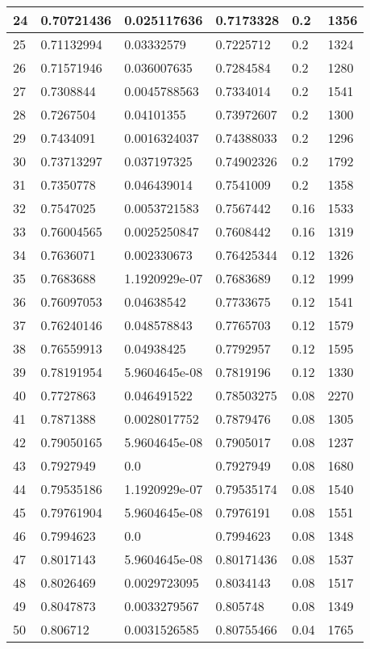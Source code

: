 \begin{longtable}{|l|l|l|l|l|l|}
24 & 0.70721436 & 0.025117636 & 0.7173328 & 0.2 & 1356 \\ \hline 
25 & 0.71132994 & 0.03332579 & 0.7225712 & 0.2 & 1324 \\ \hline 
26 & 0.71571946 & 0.036007635 & 0.7284584 & 0.2 & 1280 \\ \hline 
27 & 0.7308844 & 0.0045788563 & 0.7334014 & 0.2 & 1541 \\ \hline 
28 & 0.7267504 & 0.04101355 & 0.73972607 & 0.2 & 1300 \\ \hline 
29 & 0.7434091 & 0.0016324037 & 0.74388033 & 0.2 & 1296 \\ \hline 
30 & 0.73713297 & 0.037197325 & 0.74902326 & 0.2 & 1792 \\ \hline 
31 & 0.7350778 & 0.046439014 & 0.7541009 & 0.2 & 1358 \\ \hline 
32 & 0.7547025 & 0.0053721583 & 0.7567442 & 0.16 & 1533 \\ \hline 
33 & 0.76004565 & 0.0025250847 & 0.7608442 & 0.16 & 1319 \\ \hline 
34 & 0.7636071 & 0.002330673 & 0.76425344 & 0.12 & 1326 \\ \hline 
35 & 0.7683688 & 1.1920929e-07 & 0.7683689 & 0.12 & 1999 \\ \hline 
36 & 0.76097053 & 0.04638542 & 0.7733675 & 0.12 & 1541 \\ \hline 
37 & 0.76240146 & 0.048578843 & 0.7765703 & 0.12 & 1579 \\ \hline 
38 & 0.76559913 & 0.04938425 & 0.7792957 & 0.12 & 1595 \\ \hline 
39 & 0.78191954 & 5.9604645e-08 & 0.7819196 & 0.12 & 1330 \\ \hline 
40 & 0.7727863 & 0.046491522 & 0.78503275 & 0.08 & 2270 \\ \hline 
41 & 0.7871388 & 0.0028017752 & 0.7879476 & 0.08 & 1305 \\ \hline 
42 & 0.79050165 & 5.9604645e-08 & 0.7905017 & 0.08 & 1237 \\ \hline 
43 & 0.7927949 & 0.0 & 0.7927949 & 0.08 & 1680 \\ \hline 
44 & 0.79535186 & 1.1920929e-07 & 0.79535174 & 0.08 & 1540 \\ \hline 
45 & 0.79761904 & 5.9604645e-08 & 0.7976191 & 0.08 & 1551 \\ \hline 
46 & 0.7994623 & 0.0 & 0.7994623 & 0.08 & 1348 \\ \hline 
47 & 0.8017143 & 5.9604645e-08 & 0.80171436 & 0.08 & 1537 \\ \hline 
48 & 0.8026469 & 0.0029723095 & 0.8034143 & 0.08 & 1517 \\ \hline 
49 & 0.8047873 & 0.0033279567 & 0.805748 & 0.08 & 1349 \\ \hline 
50 & 0.806712 & 0.0031526585 & 0.80755466 & 0.04 & 1765 \\ \hline 
\end{longtable}